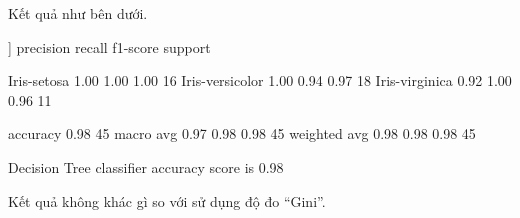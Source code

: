 Kết quả như bên dưới.

\begin{terminaloutput}
[[16  0  0]
[ 0 17  1]
[ 0  0 11]]
                 precision    recall  f1-score   support

    Iris-setosa       1.00      1.00      1.00        16
Iris-versicolor       1.00      0.94      0.97        18
 Iris-virginica       0.92      1.00      0.96        11

       accuracy                           0.98        45
      macro avg       0.97      0.98      0.98        45
   weighted avg       0.98      0.98      0.98        45

Decision Tree classifier accuracy score is 0.98
\end{terminaloutput}

Kết quả không khác gì so với sử dụng độ đo \enquote{Gini}.
